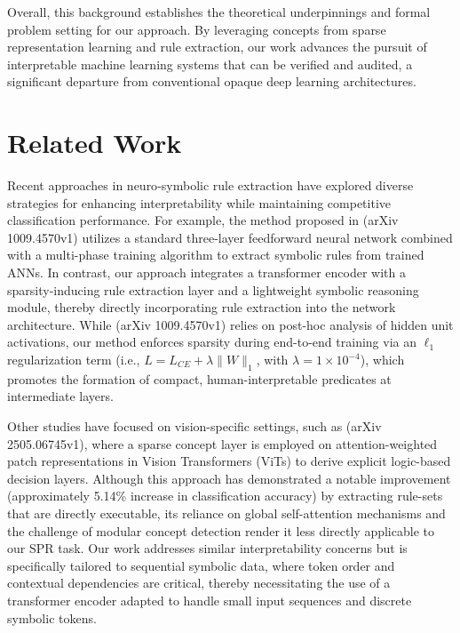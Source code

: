 \documentclass{article}
\begin{document}
Overall, this background establishes the theoretical underpinnings and formal problem setting for our approach. By leveraging concepts from sparse representation learning and rule extraction, our work advances the pursuit of interpretable machine learning systems that can be verified and audited, a significant departure from conventional opaque deep learning architectures.

\section{Related Work}
Recent approaches in neuro‐symbolic rule extraction have explored diverse strategies for enhancing interpretability while maintaining competitive classification performance. For example, the method proposed in (arXiv 1009.4570v1) utilizes a standard three-layer feedforward neural network combined with a multi-phase training algorithm to extract symbolic rules from trained ANNs. In contrast, our approach integrates a transformer encoder with a sparsity-inducing rule extraction layer and a lightweight symbolic reasoning module, thereby directly incorporating rule extraction into the network architecture. While (arXiv 1009.4570v1) relies on post-hoc analysis of hidden unit activations, our method enforces sparsity during end-to-end training via an \(\ell_1\) regularization term (i.e., \(L = L_{CE} + \lambda \|W\|_1\), with \(\lambda = 1 \times 10^{-4}\)), which promotes the formation of compact, human-interpretable predicates at intermediate layers.

Other studies have focused on vision-specific settings, such as (arXiv 2505.06745v1), where a sparse concept layer is employed on attention-weighted patch representations in Vision Transformers (ViTs) to derive explicit logic-based decision layers. Although this approach has demonstrated a notable improvement (approximately 5.14\% increase in classification accuracy) by extracting rule-sets that are directly executable, its reliance on global self-attention mechanisms and the challenge of modular concept detection render it less directly applicable to our SPR task. Our work addresses similar interpretability concerns but is specifically tailored to sequential symbolic data, where token order and contextual dependencies are critical, thereby necessitating the use of a transformer encoder adapted to handle small input sequences and discrete symbolic tokens.
\end{document}
